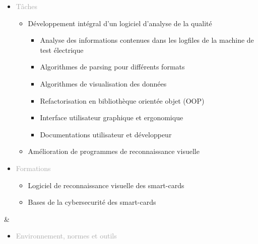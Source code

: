 \documentclass{article}
\begin{document}
\begin{tabular}
\begin{itemize}
        \item \textcolor{darkGray}{Tâches} 
        \begin{itemize}
        [label={\textcolor{gray!80}{\checkmark}}, topsep=8pt, partopsep=0pt, itemsep=0.5pt, parsep=2pt] 
            \item \textcolor{gray!80}{Développement intégral d'un logiciel d'analyse de la qualité}
            \begin{itemize}
                [label={\textcolor{gray!80}{$\triangleright$}}, topsep=0pt, partopsep=0pt, itemsep=0.5pt, parsep=2pt]
                \item \textcolor{gray!80}{Analyse des informations contenues dans les logfiles de la machine de test électrique}
                \item \textcolor{gray!80}{Algorithmes de parsing pour différents formats}
                \item \textcolor{gray!80}{Algorithmes de visualisation des données}
                \item \textcolor{gray!80}{Refactorisation en bibliothèque orientée objet (OOP)}
                \item \textcolor{gray!80}{Interface utilisateur graphique et ergonomique}
                \item \textcolor{gray!80}{Documentations utilisateur et développeur}
            \end{itemize}
            \item \textcolor{gray!80}{Amélioration de programmes de reconnaissance visuelle}
        \end{itemize}
        \item \textcolor{darkGray}{Formations} 
        \begin{itemize}
            [label={\textcolor{gray!80}{\checkmark}}, topsep=8pt, partopsep=0pt, itemsep=0.5pt, parsep=2pt] 
                \item \textcolor{gray!80}{Logiciel de reconnaissance visuelle des smart-cards}
                \item \textcolor{gray!80}{Bases de la cybersecurité des smart-cards}
        \end{itemize}
    \end{itemize}
    &
    \begin{itemize}[label={}, topsep=8pt, partopsep=0pt, itemsep=0.5pt, parsep=2pt,after=\vspace*{-\baselineskip}]
        \setlength{\itemsep}{10pt} 
        \item \textcolor{darkGray}{Environnement, normes et outils} 

\end{itemize}
\end{tabular}
\end{document}
